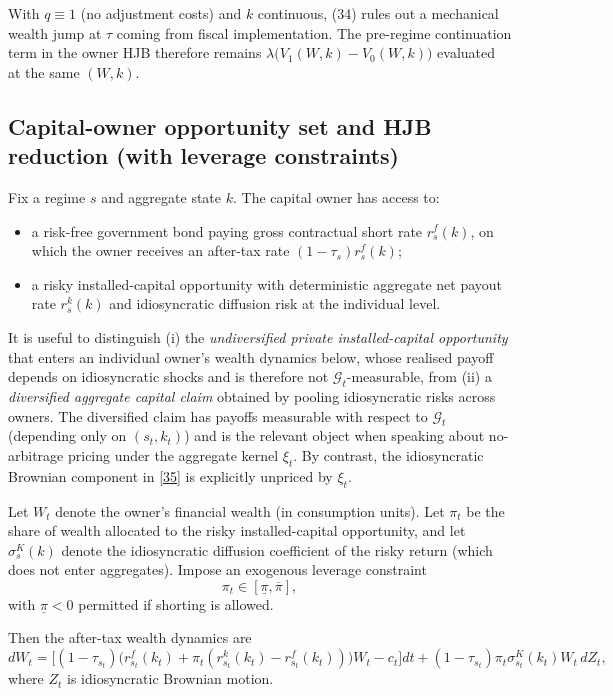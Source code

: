 \documentclass{article}
\begin{document}
With $q\equiv 1$ (no adjustment costs) and $k$ continuous, (34) rules out a mechanical wealth jump at $\tau$ coming from fiscal implementation. The pre-regime continuation term in the owner HJB therefore remains $\lambda\big(V_1(W,k)-V_0(W,k)\big)$ evaluated at the same $(W,k)$.

\subsection{Capital-owner opportunity set and HJB reduction (with leverage constraints)}
Fix a regime $s$ and aggregate state $k$. The capital owner has access to:
\begin{itemize}
\item a risk-free government bond paying gross contractual short rate $r^f_s(k)$, on which the owner receives an after-tax rate $(1-\tau_s)r^f_s(k)$;
\item a risky installed-capital opportunity with deterministic aggregate net payout rate $r^k_s(k)$ and idiosyncratic diffusion risk at the individual level.
\end{itemize}

It is useful to distinguish (i) the \emph{undiversified private installed-capital opportunity} that enters an individual owner’s wealth dynamics below, whose realised payoff depends on idiosyncratic shocks and is therefore not $\mathcal G_t$-measurable, from (ii) a \emph{diversified aggregate capital claim} obtained by pooling idiosyncratic risks across owners. The diversified claim has payoffs measurable with respect to $\mathcal G_t$ (depending only on $(s_t,k_t)$) and is the relevant object when speaking about no-arbitrage pricing under the aggregate kernel $\xi_t$. By contrast, the idiosyncratic Brownian component in \eqref{35} is explicitly unpriced by $\xi_t$.

Let $W_t$ denote the owner’s financial wealth (in consumption units). Let $\pi_t$ be the share of wealth allocated to the risky installed-capital opportunity, and let $\sigma^K_s(k)$ denote the idiosyncratic diffusion coefficient of the risky return (which does not enter aggregates). Impose an exogenous leverage constraint
\[
\pi_t \in [\underline{\pi},\overline{\pi}],
\]
with $\underline{\pi}<0$ permitted if shorting is allowed.

Then the after-tax wealth dynamics are
\begin{equation}
dW_t
=
\Big[(1-\tau_{s_t})\big(r^f_{s_t}(k_t)+\pi_t(r^k_{s_t}(k_t)-r^f_{s_t}(k_t))\big)W_t - c_t\Big]dt
+(1-\tau_{s_t})\pi_t \sigma^K_{s_t}(k_t)W_t\, dZ_t,
\tag{35}
\end{equation}
where $Z_t$ is idiosyncratic Brownian motion.
\end{document}

